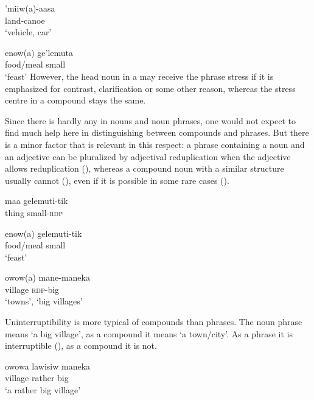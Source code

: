 \ea%
\label{ex:x31}
\gll 'miiw(a)-aasa\footnotemark{} \\
land-canoe\\
\glt`vehicle, car'
\z
{}

\ea%
\label{ex:x32}
\gll enow(a) ge'lemuta{\footnotemark} \\
food/meal small\\
\glt`feast'
\z
{}
However, the head noun in a  may receive the phrase stress if it is emphasized for contrast, clarification or some other reason, whereas the stress centre in a compound stays the same. 

Since there is hardly any  in nouns and noun phrases, one would not expect to find much help here in distinguishing between compounds and phrases. But there is a minor factor that is relevant in this respect: a phrase containing a noun and an adjective can be pluralized by adjectival reduplication when the adjective allows reduplication (), whereas a compound noun with a similar structure usually cannot (), even if it is possible in some rare cases (). 

\ea%
\label{ex:x33}
\gll maa gelemuti-tik \\
thing small-\textsc{rdp}\\
\z

\ea%
\label{ex:x34}
\gll *enow(a) gelemuti-tik \\
food/meal small\\
\glt `feast'
\z


\ea%
\label{ex:x35}
\gll owow(a) mane-maneka \\
village \textsc{rdp}-big\\
\glt`towns', `big villages'
\z

Uninterruptibility is more typical of compounds than phrases. The noun phrase  means `a big village', as a compound it means `a town/city'. As a phrase it is interruptible (), as a compound it is not.

\ea%
\label{ex:x1768}
\gll owowa lawisiw maneka \\
village rather big\\
\glt`a rather big village'
\z

